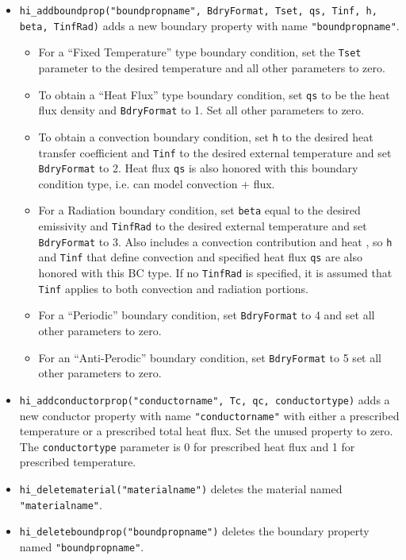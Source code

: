 \begin{itemize}
\item \texttt{hi\_addboundprop("boundpropname", BdryFormat, Tset, qs, Tinf, h, beta, TinfRad)}
 adds a new boundary property with name {\tt "boundpropname"}.
\begin{itemize}
\item For a ``Fixed Temperature'' type boundary condition, set the {\tt Tset} parameter to the
desired temperature and all other parameters to zero.
\item To obtain a ``Heat Flux'' type boundary condition, set {\tt qs} to be the heat flux density and
{\tt BdryFormat} to 1. Set all other parameters to zero.
\item To obtain a convection boundary condition, set {\tt h} to the desired heat transfer coefficient and
{\tt Tinf} to the desired external temperature and set {\tt BdryFormat} to 2.  Heat flux {\tt qs} is also honored with this boundary
condition type, i.e. can model convection + flux.
\item For a Radiation boundary condition, set {\tt beta} equal to the desired emissivity and {\tt TinfRad} to the 
desired external temperature and set {\tt BdryFormat} to 3. Also includes a convection contribution and heat , so {\tt h} and {\tt Tinf} that define convection and specified heat flux {\tt qs} are also honored with this BC type.  If no {\tt TinfRad} is specified, it is assumed that {\tt Tinf} applies to both convection and radiation portions.
\item For a ``Periodic'' boundary condition, set {\tt BdryFormat} to 4 and set all other
parameters to zero.
\item For an ``Anti-Perodic'' boundary condition, set {\tt BdryFormat} to 5 set all other
parameters to zero.
\end{itemize}

\item \texttt{hi\_addconductorprop("conductorname", Tc, qc, conductortype)} adds a new
conductor property with name \texttt{"conductorname"} with either a
prescribed temperature or a prescribed total heat flux. Set the unused
property to zero. The \texttt{conductortype} parameter is 0 for
prescribed heat flux and 1 for prescribed temperature.

\item \texttt{hi\_deletematerial("materialname")} deletes the material named
\texttt{"materialname"}.

\item \texttt{hi\_deleteboundprop("boundpropname")} deletes the boundary property
named \texttt{"boundpropname"}.


\end{itemize}
